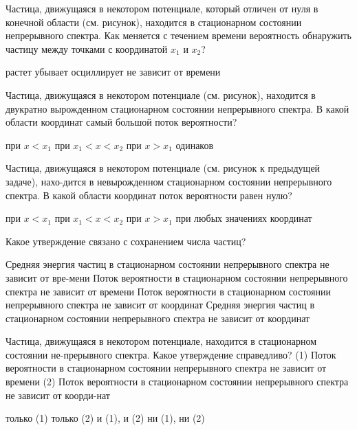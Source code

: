 \documentclass[11pt,a4paper]{exam}
\begin{document}
\begin{questions}
\question Частица, движущаяся в некотором потенциале, который отличен от нуля в конечной области (см. рисунок), находится в стационарном состоянии непрерывного спектра. Как меняется с течением времени вероятность обнаружить частицу между точками с координатой ${x_1}$ и ${x_2}$?
\begin{choices}
\choice растет   
\choice убывает  
\choice осциллирует 
\choice не зависит от времени
\end{choices}

\question Частица, движущаяся в некотором потенциале (см. рисунок), находится в двукратно вырожденном стационарном состоянии непрерывного спектра. В какой области координат самый большой поток вероятности? 
\begin{choices}
\choice при $x < {x_1}$         
\choice при ${x_1} < x < {x_2}$
\choice при $x > {x_1}$         
\choice одинаков
\end{choices}

\question Частица, движущаяся в некотором потенциале (см. рисунок к предыдущей задаче), нахо-дится в невырожденном стационарном состоянии непрерывного спектра. В какой области координат поток вероятности равен нулю? 
\begin{choices}
\choice при $x < {x_1}$         
\choice при ${x_1} < x < {x_2}$
\choice при $x > {x_1}$         
\choice при любых значениях координат
\end{choices}

\question Какое утверждение связано с сохранением числа частиц?
\begin{choices}
\choice Средняя энергия частиц в стационарном состоянии непрерывного спектра не зависит от вре-мени
\choice Поток вероятности в стационарном состоянии непрерывного спектра не зависит от времени
\choice Поток вероятности в стационарном состоянии непрерывного спектра не зависит от координат
\choice Средняя энергия частиц в стационарном состоянии непрерывного спектра не зависит от координат
\end{choices}

\question Частица, движущаяся в некотором потенциале, находится в стационарном состоянии не-прерывного спектра. Какое утверждение справедливо?
(1) Поток вероятности в стационарном состоянии непрерывного спектра не зависит от времени
(2) Поток вероятности в стационарном состоянии непрерывного спектра не зависит от коорди-нат
\begin{choices}
\choice только (1)     
\choice только (2)     
\choice и (1), и (2)      
\choice ни (1), ни (2)
\end{choices}


\end{questions}
\end{document}
